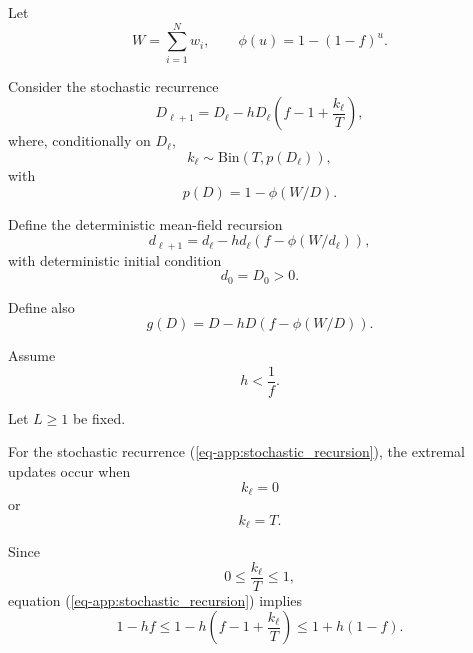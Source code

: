 \documentclass[10pt]{iopart}
\newcommand{\1}{\mathbf{1}}
\begin{document}
Let
\begin{equation}
W=\sum_{i=1}^N w_i,
\qquad
\phi(u)=1-(1-f)^u .
\label{eq-app:phi_def}
\end{equation}

Consider the stochastic recurrence
\begin{equation}
D_{\ell+1}
=
D_\ell-hD_\ell
\left(
f-1+\frac{k_\ell}{T}
\right),
\label{eq-app:stochastic_recursion}
\end{equation}
where, conditionally on $D_\ell$,
\begin{equation}
k_\ell
\sim
\mathrm{Bin}(T,p(D_\ell)),
\label{eq-app:binomial_def}
\end{equation}
with
\begin{equation}
p(D)=1-\phi(W/D).
\label{eq-app:p_def}
\end{equation}

Define the deterministic mean-field recursion
\begin{equation}
d_{\ell+1}
=
d_\ell-hd_\ell
\left(
f-\phi(W/d_\ell)
\right),
\label{eq-app:meanfield_recursion}
\end{equation}
with deterministic initial condition
\begin{equation}
d_0=D_0>0.
\label{eq-app:init_cond}
\end{equation}

Define also
\begin{equation}
g(D)=D-hD(f-\phi(W/D)).
\label{eq-app:g_def}
\end{equation}

Assume
\begin{equation}
h<\frac1f.
\label{eq-app:h_assumption}
\end{equation}

Let $L\ge1$ be fixed.

For the stochastic recurrence (\ref{eq-app:stochastic_recursion}), the extremal updates occur when
\begin{equation}
k_\ell=0
\label{eq:k_zero}
\end{equation}
or
\begin{equation}
k_\ell=T.
\label{eq-app:k_T}
\end{equation}

Since
\begin{equation}
0\le \frac{k_\ell}{T}\le 1,
\label{eq-app:k_bounds}
\end{equation}
equation (\ref{eq-app:stochastic_recursion})  implies
\begin{equation}
1-hf
\le
1-h\left(f-1+\frac{k_\ell}{T}\right)
\le
1+h(1-f).
\label{eq-app:update_factor_bounds}
\end{equation}
\end{document}
